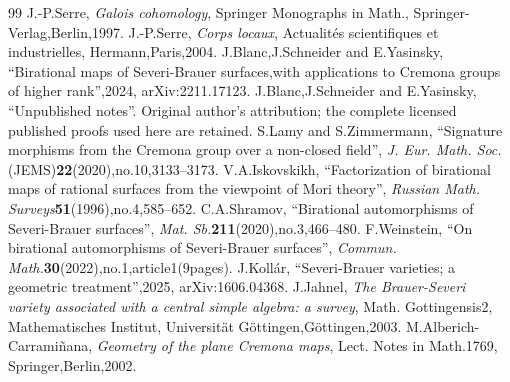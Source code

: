 \documentclass[10pt,a4paper]{amsart}
\theoremstyle{definition}
\begin{document}
\begin{thebibliography}{99}
 J.-P.Serre, \emph{Galois cohomology}, Springer Monographs in Math., Springer-Verlag,Berlin,1997.
 J.-P.Serre, \emph{Corps locaux}, Actualités scientifiques et industrielles, Hermann,Paris,2004.
 J.Blanc,J.Schneider and E.Yasinsky, ``Birational maps of Severi-Brauer surfaces,with applications to Cremona groups of higher rank'',2024, arXiv:2211.17123.
 J.Blanc,J.Schneider and E.Yasinsky, ``Unpublished notes''. Original author's attribution; the complete licensed published proofs used here are retained.
 S.Lamy and S.Zimmermann, ``Signature morphisms from the Cremona group over a non-closed field'', \emph{J. Eur. Math. Soc.}(JEMS)\textbf{22}(2020),no.10,3133--3173.
 V.A.Iskovskikh, ``Factorization of birational maps of rational surfaces from the viewpoint of Mori theory'', \emph{Russian Math. Surveys}\textbf{51}(1996),no.4,585--652.
 C.A.Shramov, ``Birational automorphisms of Severi-Brauer surfaces'', \emph{Mat. Sb.}\textbf{211}(2020),no.3,466--480.
 F.Weinstein, ``On birational automorphisms of Severi-Brauer surfaces'', \emph{Commun. Math.}\textbf{30}(2022),no.1,article1(9pages).
 J.Kollár, ``Severi-Brauer varieties; a geometric treatment'',2025, arXiv:1606.04368.
 J.Jahnel, \emph{The Brauer-Severi variety associated with a central simple algebra: a survey}, Math. Gottingensis2, Mathematisches Institut, Universität Göttingen,Göttingen,2003.
 M.Alberich-Carramiñana, \emph{Geometry of the plane Cremona maps}, Lect. Notes in Math.1769, Springer,Berlin,2002.
\end{thebibliography}
\end{document}
